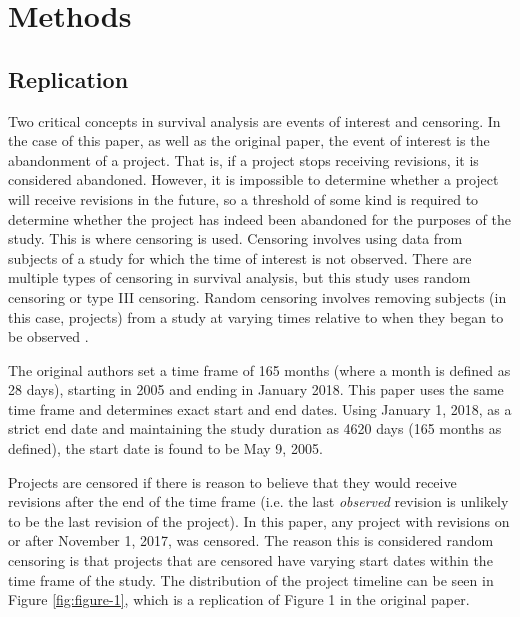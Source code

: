 \documentclass[acmconf]{acmart}
\begin{document}

\section{Methods} \label{methods}

\subsection{Replication} \label{replmethods}

Two critical concepts in survival analysis are events of interest and censoring.
In the case of this paper, as well as the original paper, the event of interest is the abandonment of a project.
That is, if a project stops receiving revisions, it is considered abandoned.
However, it is impossible to determine whether a project will receive revisions in the future, so a threshold of some kind is required to determine whether the project has indeed been abandoned for the purposes of the study.
This is where censoring is used.
Censoring involves using data from subjects of a study for which the time of interest is not observed.
There are multiple types of censoring in survival analysis, but this study uses random censoring or type III censoring.
Random censoring involves removing subjects (in this case, projects) from a study at varying times relative to when they began to be observed \cite{renganathan2016overview}. 

The original authors set a time frame of 165 months (where a month is defined as 28 days), starting in 2005 and ending in January 2018.
This paper uses the same time frame and determines exact start and end dates.
Using January 1, 2018, as a strict end date and maintaining the study duration as 4620 days (165 months as defined), the start date is found to be May 9, 2005.

Projects are censored if there is reason to believe that they would receive revisions after the end of the time frame (i.e. the last \emph{observed} revision is unlikely to be the last revision of the project).
In this paper, any project with revisions on or after November 1, 2017, was censored. 
The reason this is considered random censoring is that projects that are censored have varying start dates within the time frame of the study.
The distribution of the project timeline can be seen in Figure \ref{fig:figure-1}, which is a replication of Figure 1 in the original paper.
\end{document}
